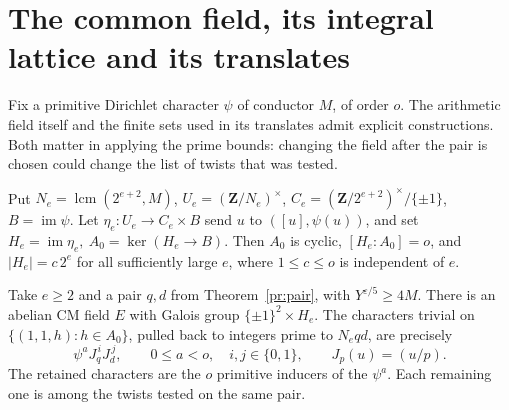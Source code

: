 \section{The common field, its integral lattice and its translates}\label{host:sec}

Fix a primitive Dirichlet character \(\psi\) of conductor \(M\), of order
\(o\). The arithmetic field itself and the finite sets used in its
translates admit explicit constructions. Both matter in applying the
prime bounds: changing the field after the pair is chosen could change
the list of twists that was tested.

\begin{proposition}\label{host:art}
Put \(N_e=\operatorname{lcm}(2^{e+2},M)\), \(U_e=(\mathbf Z/N_e)^\times\),
\(C_e=(\mathbf Z/2^{e+2})^\times/\{\pm1\}\), \(B=\operatorname{im}\psi\).
Let \(\eta_e:U_e\to C_e\times B\) send \(u\) to \(([u],\psi(u))\),
and set \(H_e=\operatorname{im}\eta_e,\ A_0=\ker(H_e\to B)\).
Then \(A_0\) is cyclic, \([H_e:A_0]=o\), and \(|H_e|=c\,2^e\) for all
sufficiently large \(e\), where \(1\le c\le o\) is independent of \(e\).

Take \(e\ge2\) and a pair \(q,d\) from Theorem~\ref{pr:pair}, with
\(Y^{\varepsilon/5}\ge4M\). There is an abelian CM field \(E\) with
Galois group \(\{\pm1\}^2\times H_e\). The characters trivial on
\(\{(1,1,h):h\in A_0\}\), pulled back to integers prime to \(N_e qd\),
are precisely
\[
      \psi^a J_q^{\,i}J_d^{\,j},
 \qquad 0\le a<o,\quad i,j\in\{0,1\},\qquad J_p(u)=(u/p).
\]
The retained characters are the \(o\) primitive inducers of the
\(\psi^a\). Each remaining one is among the twists tested on the same pair.
\end{proposition}

